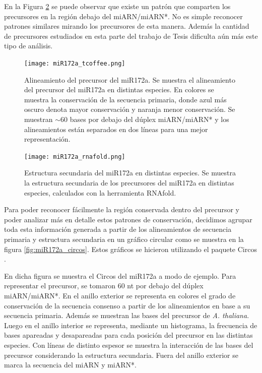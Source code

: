 En la Figura \ref{fig:miR172a_rnafold} se puede observar que existe un patrón que comparten los precursores en la región debajo del miARN/miARN*.
No es simple reconocer patrones similares mirando los precursores de esta manera.
Además la cantidad de precursores estudiados en esta parte del trabajo de Tesis dificulta aún más este tipo de análisis.

\begin{landscape}
    \begin{figure}[htbp!] 
        \centering    
        \texttt{[image: miR172a\_tcoffee.png]}
        \caption[Alineamiento del precursor del miR172a.]{Alineamiento del precursor del miR172a. 
        Se muestra el alineamiento del precursor del miR172a en distintas especies. 
        En colores se muestra la conservación de la secuencia primaria, donde azul más oscuro denota mayor conservación y naranja menor conservación.
        Se muestran $\sim$60 bases por debajo del dúplex miARN/miARN* y los alineamientos están separados en dos líneas para una mejor representación.}
         \label{fig:miR172a_tcoffee}
    \end{figure}
\end{landscape}


\begin{landscape}
    \begin{figure}[htbp!] 
        \centering    
        \texttt{[image: miR172a\_rnafold.png]}
        \caption[Estructura secundaria del miR172a en distintas especies]{
        Estructura secundaria del miR172a en distintas especies.
        Se muestra la estructura secundaria de los precursores del miR172a en distintas especies, calculados con la herramienta RNAfold.
        }
        \label{fig:miR172a_rnafold}
    \end{figure}
\end{landscape}

Para poder reconocer fácilmente la región conservada dentro del precursor y poder analizar más en detalle estos patrones de conservación, decidimos agrupar toda esta información
 generada a partir de los alineamientos de secuencia primaria y estructura secundaria en un gráfico circular como se muestra en la figura \ref{fig:miR172a_circos}.
Estos gráficos se hicieron utilizando el paquete Circos \citep{pmid19541911}.
 
En dicha figura se muestra el Circos del miR172a a modo de ejemplo.
Para representar el precursor, se tomaron 60 nt por debajo del dúplex miARN/miARN*.
En el anillo exterior se representa en colores el grado de conservación de la secuencia consenso a partir de los alineamientos en base a su secuencia primaria.
Además se muestran las bases del precursor de \textit {A. thaliana}.
Luego en el anillo interior se representa, mediante un histograma, la frecuencia de bases apareadas y desapareadas para cada posición del precursor en las distintas especies.
Con líneas de distinto espesor se muestra la interacción de las bases del precursor considerando la estructura secundaria. 
Fuera del anillo exterior se marca la secuencia del miARN y miARN*.

